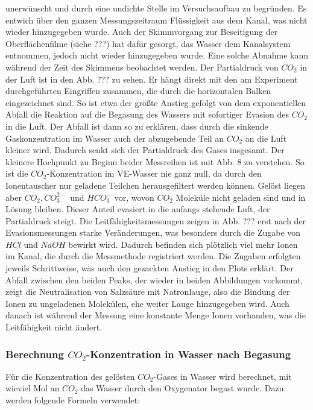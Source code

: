 \documentclass[12pt]{article}
\begin{document}
unerwünscht und durch eine undichte Stelle im Versuchsaufbau zu begründen. Es entwich über den ganzen Messungszeitraum Flüssigkeit aus dem Kanal, was
nicht wieder hinzugegeben wurde. Auch der Skimmvorgang zur Beseitigung der Oberflächenfilme (siehe ???) hat dafür gesorgt, das Wasser dem Kanalsystem entnommen,
jedoch nicht wieder hinzugegeben wurde. Eine solche Abnahme kann während der Zeit des Skimmens beobachtet werden.
Der Partialdruck von $CO_2$ in der Luft ist in den Abb. ??? zu sehen. Er hängt direkt mit den am Experiment durchgeführten Eingriffen zusammen, die durch die horizontalen Balken
eingezeichnet sind. So ist etwa der größte Anstieg gefolgt von dem exponentiellen Abfall die Reaktion auf die Begasung des
Wassers mit sofortiger Evasion des $CO_2$ in die Luft. Der Abfall ist dann so zu erklären, dass durch die sinkende Gaskonzentration im Wasser auch
der abzugebende Teil an $CO_2$ an die Luft kleiner wird. Dadurch senkt sich der Partialdruck des Gases insgesamt.
Der kleinere Hochpunkt zu Beginn beider Messreihen ist mit \cite{jaehne} Abb. 8 zu verstehen. So ist die $CO_2$-Konzentration im VE-Wasser nie ganz
null, da durch den Ionentauscher nur geladene Teilchen herausgefiltert werden können. Gelöst liegen aber $CO_2, CO_3^{2-} $ und $HCO_3^-$ vor,
wovon $CO_2$ Moleküle nicht geladen sind und in Lösung bleiben. Dieser Anteil evasiert in die anfangs stehende Luft, der Partialdruck steigt.
Die Leitfähigkeitsmessungen zeigen in Abb. ??? erst nach der Evasionsmessungen starke Veränderungen, was besonders durch die Zugabe von $HCl$ und $NaOH$
bewirkt wird. Dadurch befinden sich plötzlich viel mehr Ionen im Kanal, die durch die Messmethode registriert werden. Die Zugaben erfolgten jeweils
Schrittweise, was auch den gezackten Anstieg in den Plots erklärt. Der Abfall zwischen den beiden Peaks, der wieder in beiden Abbildungen vorkommt,
zeigt die Neutralisation von Salzsäure mit Natronlauge, also die Bindung der Ionen zu ungeladenen Molekülen, ehe weiter Lauge hinzugegeben wird. Auch
danach ist während der Messung eine konstante Menge Ionen vorhanden, was die Leitfähigkeit nicht ändert.



\subsubsection{Berechnung $CO_2$-Konzentration in Wasser nach Begasung}

Für die Konzentration des gelösten $CO_2$-Gases in Wasser wird berechnet, mit wieviel Mol an $CO_2$ das Wasser durch den Oxygenator begast wurde. Dazu werden folgende Formeln verwendet:
\end{document}
